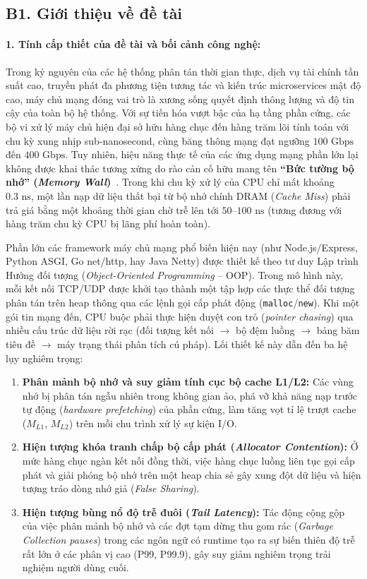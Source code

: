 \documentclass[letterpaper]{article}
\begin{document}
\subsection{B1. Giới thiệu về đề tài}

\paragraph{1. Tính cấp thiết của đề tài và bối cảnh công nghệ:}
Trong kỷ nguyên của các hệ thống phân tán thời gian thực, dịch vụ tài chính tần suất cao, truyền phát đa phương tiện tương tác và kiến trúc microservices mật độ cao, máy chủ mạng đóng vai trò là xương sống quyết định thông lượng và độ tin cậy của toàn bộ hệ thống. Với sự tiến hóa vượt bậc của hạ tầng phần cứng, các bộ vi xử lý máy chủ hiện đại sở hữu hàng chục đến hàng trăm lõi tính toán với chu kỳ xung nhịp sub-nanosecond, cùng băng thông mạng đạt ngưỡng $100\text{ Gbps}$ đến $400\text{ Gbps}$. Tuy nhiên, hiệu năng thực tế của các ứng dụng mạng phần lớn lại không được khai thác tương xứng do rào cản cố hữu mang tên \textbf{``Bức tường bộ nhớ'' (\emph{Memory Wall})}~\cite{drepper_memory}. Trong khi chu kỳ xử lý của CPU chỉ mất khoảng $0.3\text{ ns}$, một lần nạp dữ liệu thất bại từ bộ nhớ chính DRAM (\emph{Cache Miss}) phải trả giá bằng một khoảng thời gian chờ trễ lên tới $50\text{--}100\text{ ns}$ (tương đương với hàng trăm chu kỳ CPU bị lãng phí hoàn toàn).

Phần lớn các framework máy chủ mạng phổ biến hiện nay (như Node.js/Express, Python ASGI, Go net/http, hay Java Netty) được thiết kế theo tư duy Lập trình Hướng đối tượng (\emph{Object-Oriented Programming} -- OOP). Trong mô hình này, mỗi kết nối TCP/UDP được khởi tạo thành một tập hợp các thực thể đối tượng phân tán trên heap thông qua các lệnh gọi cấp phát động (\texttt{malloc}/\texttt{new}). Khi một gói tin mạng đến, CPU buộc phải thực hiện duyệt con trỏ (\emph{pointer chasing}) qua nhiều cấu trúc dữ liệu rời rạc (đối tượng kết nối $\to$ bộ đệm luồng $\to$ bảng băm tiêu đề $\to$ máy trạng thái phân tích cú pháp). Lối thiết kế này dẫn đến ba hệ lụy nghiêm trọng:
\begin{enumerate}
    \item \textbf{Phân mảnh bộ nhớ và suy giảm tính cục bộ cache L1/L2:} Các vùng nhớ bị phân tán ngẫu nhiên trong không gian ảo, phá vỡ khả năng nạp trước tự động (\emph{hardware prefetching}) của phần cứng, làm tăng vọt tỉ lệ trượt cache ($M_{L1}$, $M_{L2}$) trên mỗi chu trình xử lý sự kiện I/O.
    \item \textbf{Hiện tượng khóa tranh chấp bộ cấp phát (\emph{Allocator Contention}):} Ở mức hàng chục ngàn kết nối đồng thời, việc hàng chục luồng liên tục gọi cấp phát và giải phóng bộ nhớ trên một heap chia sẻ gây xung đột dữ liệu và hiện tượng tráo dòng nhớ giả (\emph{False Sharing}).
    \item \textbf{Hiện tượng bùng nổ độ trễ đuôi (\emph{Tail Latency}):} Tác động cộng gộp của việc phân mảnh bộ nhớ và các đợt tạm dừng thu gom rác (\emph{Garbage Collection pauses}) trong các ngôn ngữ có runtime tạo ra sự biến thiên độ trễ rất lớn ở các phân vị cao (P99, P99.9), gây suy giảm nghiêm trọng trải nghiệm người dùng cuối.
\end{enumerate}
\end{document}
